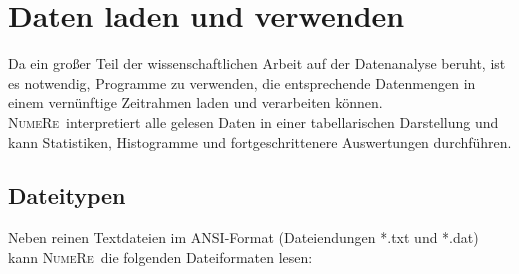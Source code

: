 \documentclass[DIV=14,headsepline,footsepline]{scrbook}
\newcommand{\NR}{\textsc{Nu\-me\-Re}}
\begin{document}
		\chapter{Daten laden und verwenden}
			Da ein großer Teil der wissenschaftlichen Arbeit auf der Datenanalyse beruht, ist es notwendig, Programme zu verwenden, die entsprechende Datenmengen in einem vernünftige Zeitrahmen laden und verarbeiten können. \NR\ interpretiert alle gelesen Daten in einer tabellarischen Darstellung und kann Statistiken, Histogramme und fortgeschrittenere Auswertungen durchführen.
			\section{Dateitypen}
				Neben reinen Textdateien im ANSI-Format (Dateiendungen *.txt und *.dat) kann \NR\ die folgenden Dateiformaten lesen:
\end{document}
